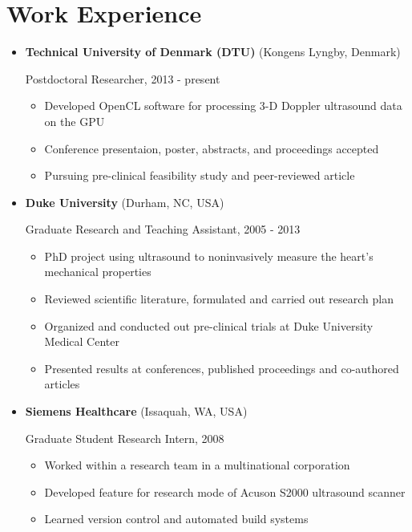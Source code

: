 \documentclass[letterpaper,10pt,english]{sphinxmanual}
\begin{document}
\section{Work Experience}
\label{resume:work-experience}\begin{itemize}
\item {} 
\textbf{Technical University of Denmark (DTU)} (Kongens Lyngby, Denmark)

Postdoctoral Researcher, 2013 - present
\begin{itemize}
\item {} 
Developed OpenCL software for processing 3-D Doppler ultrasound
data on the GPU

\item {} 
Conference presentaion, poster, abstracts, and proceedings
accepted

\item {} 
Pursuing pre-clinical feasibility study and peer-reviewed article

\end{itemize}

\item {} 
\textbf{Duke University} (Durham, NC, USA)

Graduate Research and Teaching Assistant, 2005 - 2013
\begin{itemize}
\item {} 
PhD project using ultrasound to noninvasively measure the heart's
mechanical properties

\item {} 
Reviewed scientific literature, formulated and carried out
research plan

\item {} 
Organized and conducted out pre-clinical trials at Duke University
Medical Center

\item {} 
Presented results at conferences, published proceedings and
co-authored articles

\end{itemize}

\item {} 
\textbf{Siemens Healthcare} (Issaquah, WA, USA)

Graduate Student Research Intern, 2008
\begin{itemize}
\item {} 
Worked within a research team in a multinational corporation

\item {} 
Developed feature for research mode of Acuson S2000 ultrasound
scanner

\item {} 
Learned version control and automated build systems

\end{itemize}

\end{itemize}
\end{document}
